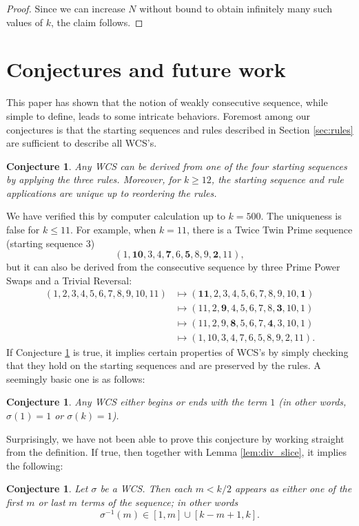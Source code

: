 \documentclass{article}
\newtheorem{conjecture}[theorem]{Conjecture}
\theoremstyle{definition}
\theoremstyle{remark}
\numberwithin{equation}{section}
\numberwithin{case}{theorem}
\begin{document}
\begin{proof}
    Since we can increase $N$ without bound to obtain infinitely many such values of $k$, the claim follows.
\end{proof}

\section{Conjectures and future work} \label{sec:further}
This paper has shown that the notion of weakly consecutive sequence, while simple to define, leads to some intricate behaviors. Foremost among our conjectures is that the starting sequences and rules described in Section \ref{sec:rules} are sufficient to describe all WCS's. 

\begin{conjecture}\label{conj:main}
    Any WCS can be derived from one of the four starting sequences by applying the three rules. Moreover, for $k \geq 12$, the starting sequence and rule applications are unique up to reordering the rules.
\end{conjecture}
We have verified this by computer calculation up to $k = 500$.  The uniqueness is false for $k \leq 11$. For example, when $k = 11$, there is a Twice Twin Prime sequence (starting sequence 3)
\[
  (1,\mathbf{10},3,4,\mathbf{7},6,\mathbf{5},8,9,\mathbf{2},11),
\]
but it can also be derived from the consecutive sequence by three Prime Power Swaps and a Trivial Reversal:
\begin{align*}
  (1,2,3,4,5,6,7,8,9,10,11)
  &\mapsto (\mathbf{11},2,3,4,5,6,7,8,9,10,\mathbf{1}) \\
  &\mapsto (11,2,\mathbf{9},4,5,6,7,8,\mathbf{3},10,1) \\
  &\mapsto (11,2,9,\mathbf{8},5,6,7,\mathbf{4},3,10,1) \\
  &\mapsto (1,10,3,4,7,6,5,8,9,2,11).
\end{align*}
If Conjecture \ref{conj:main} is true, it implies certain properties of WCS's by simply checking that they hold on the starting sequences and are preserved by the rules. A seemingly basic one is as follows:
\begin{conjecture}\label{conj:1 at end}
  Any WCS either begins or ends with the term $1$ (in other words, $\sigma(1) = 1$ or $\sigma(k) = 1$).
\end{conjecture}
Surprisingly, we have not been able to prove this conjecture by working straight from the definition. If true, then together with Lemma \ref{lem:div_slice}, it implies the following:
\begin{conjecture}\label{conj:m near end}
  Let $\sigma$ be a WCS. Then each $m < k/2$ appears as either one of the first $m$ or last $m$ terms of the sequence; in other words
  \[
    \sigma^{-1}(m) \in [1,m] \cup [k-m+1,k].
  \]
\end{conjecture}
\end{document}
